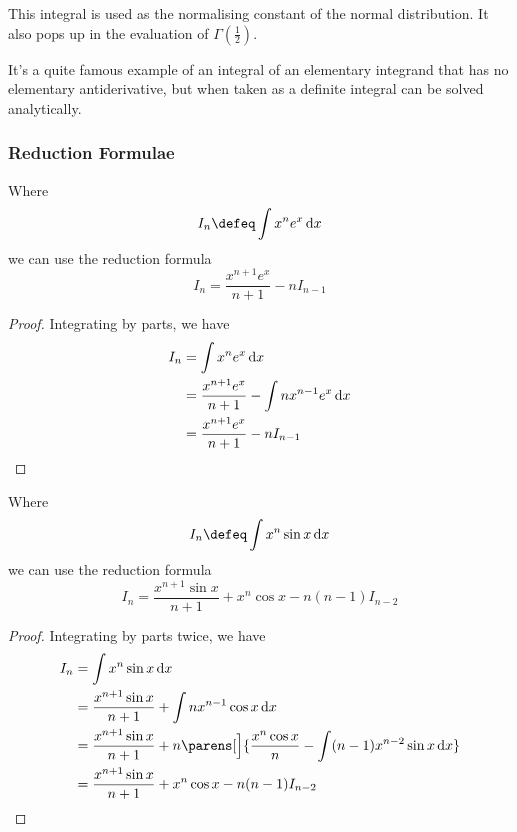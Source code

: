 This integral is used as the normalising constant of the normal
distribution. It also pops up in the evaluation of \(\Gamma(\frac 12)\).

It's a quite famous example of an integral of an elementary integrand that
has no elementary antiderivative, but when taken as a definite integral can
be solved analytically.

\subsubsection{Reduction Formulae}

\begin{theorem}
 Where
 \begin{equation*}
  I_n \defeq \integ{x^n e^x}{x}
 \end{equation*}
 we can use the reduction formula
 \begin{equation*}
  I_n = \frac{x^{n + 1} e^x}{n + 1} - nI_{n - 1}
 \end{equation*}
\end{theorem}
\begin{proof}
 Integrating by parts, we have
 \begin{align*}
  I_n &= \integ{x^n e^x}{x} \\
      &= \frac{x^{n + 1}e^x}{n + 1} - \integ{n x^{n - 1} e^x}{x} \\
      &= \frac{x^{n + 1}e^x}{n + 1} - n I_{n - 1} \qedhere
 \end{align*}
\end{proof}
\begin{theorem}
 Where
 \begin{equation*}
  I_n \defeq \integ{x^n \sin x}{x}
 \end{equation*}
 we can use the reduction formula
 \begin{equation*}
  I_n = \frac{x^{n + 1} \sin x}{n + 1} + x^n \cos x - n(n - 1)I_{n - 2}
 \end{equation*}
\end{theorem}
\begin{proof}
 Integrating by parts twice, we have
 \begin{align*}
  I_n &= \integ{x^n \sin x}{x} \\
      &= \frac{x^{n + 1} \sin x}{n + 1} + \integ{n x^{n - 1} \cos x}{x} \\
      &= \frac{x^{n + 1} \sin x}{n + 1} + n\parens[\Big]{
       \frac{x^n \cos x}{n} - \integ{(n - 1)x^{n - 2} \sin x}{x}} \\
      &= \frac{x^{n + 1} \sin x}{n + 1} + x^n \cos x - n(n - 1)I_{n - 2}
       \qedhere
 \end{align*}
\end{proof}
